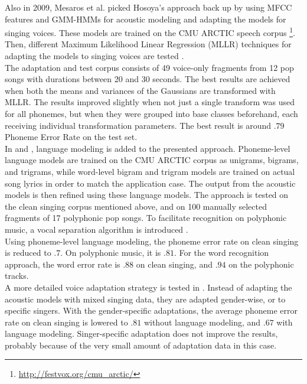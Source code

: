 Also in 2009, Mesaros et al. picked Hosoya's approach back up by using MFCC features and GMM-HMMs for acoustic modeling \cite{Mesaros2009} and adapting the models for singing voices. These models are trained on the CMU ARCTIC speech corpus \footnote{\url{http://festvox.org/cmu_arctic/}}. Then, different Maximum Likelihood Linear Regression (MLLR) techniques for adapting the models to singing voices are tested \cite{mllr}.\\
The adaptation and test corpus consists of 49 voice-only fragments from 12 pop songs with durations between 20 and 30 seconds. The best results are achieved when both the means and variances of the Gaussians are transformed with MLLR. The results improved slightly when not just a single transform was used for all phonemes, but when they were grouped into base classes beforehand, each receiving individual transformation parameters. The best result is around $.79$ Phoneme Error Rate on the test set.\\
In \cite{Mesaros2010} and \cite{Mesaros2011}, language modeling is added to the presented approach. Phoneme-level language models are trained on the CMU ARCTIC corpus as unigrams, bigrams, and trigrams, while word-level bigram and trigram models are trained on actual song lyrics in order to match the application case. The output from the acoustic models is then refined using these language models. The approach is tested on the clean singing corpus mentioned above, and on 100 manually selected fragments of 17 polyphonic pop songs. To facilitate recognition on polyphonic music, a vocal separation algorithm is introduced \cite{virtanen_separation}.\\
Using phoneme-level language modeling, the phoneme error rate on clean singing is reduced to $.7$. On polyphonic music, it is $.81$. For the word recognition approach, the word error rate is $.88$ on clean singing, and $.94$ on the polyphonic tracks.\\
A more detailed voice adaptation strategy is tested in \cite{mesaros2}. Instead of adapting the acoustic models with mixed singing data, they are adapted gender-wise, or to specific singers. With the gender-specific adaptations, the average phoneme error rate on clean singing is lowered to $.81$ without language modeling, and $.67$ with language modeling. Singer-specific adaptation does not improve the results, probably because of the very small amount of adaptation data in this case.\\
